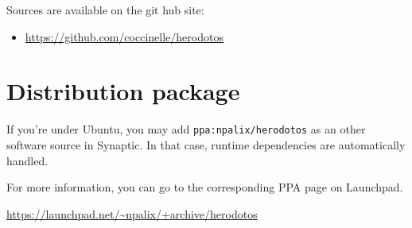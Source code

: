 Sources are available on the git hub site:
\begin{itemize}
\item \url{https://github.com/coccinelle/herodotos}
\end{itemize}

\section{Distribution package}
\label{sec:distro-package}

If you're under Ubuntu, you may add \texttt{ppa:npalix/herodotos} as
an other software source in Synaptic. In that case, runtime
dependencies are automatically handled.

\noindent For more information, you can go to the corresponding PPA page on Launchpad.

\url{https://launchpad.net/~npalix/+archive/herodotos}

